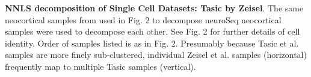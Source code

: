 \textbf{NNLS decomposition of Single Cell Datasets: Tasic by Zeisel}. The same neocortical samples from \citep{Tasic_2018,Zeisel_2018} used in Fig. 2 to decompose neuroSeq neocortical samples were used to decompose each other. See Fig. 2 for further details of cell identity. Order of samples listed is as in Fig. 2. Presumably because Tasic et al. samples are more finely sub-clustered, individual Zeisel et al. samples (horizontal) frequently map to multiple Tasic samples (vertical).